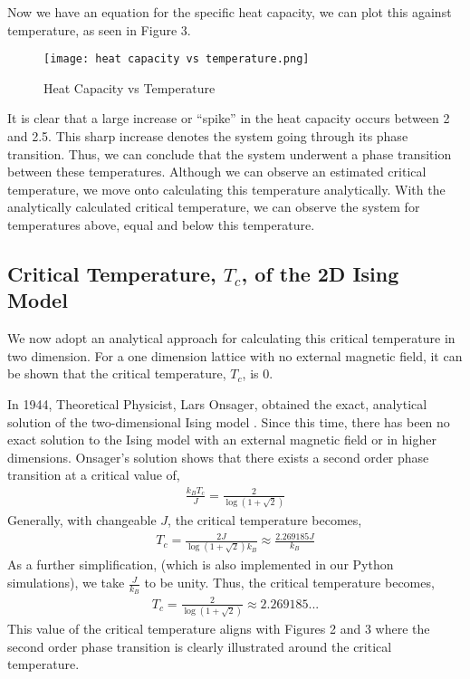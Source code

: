 \documentclass[a4paper]{article}
\begin{document}
Now we have an equation for the specific heat capacity, we can plot this against temperature, as seen in Figure 3. 

\begin{figure}[h!]
  \texttt{[image: heat capacity vs temperature.png]}
  \caption{Heat Capacity vs Temperature}
  \label{fig:estimated_mean}
\end{figure} 

It is clear that a large increase or “spike” in the heat capacity occurs between 2 and 2.5. This sharp increase denotes the system going through its phase transition. Thus, we can conclude that the system underwent a phase transition between these temperatures. Although we can observe an estimated critical temperature, we move onto calculating this temperature analytically. With the analytically calculated critical temperature, we can observe the system for temperatures above, equal and below this temperature.

\subsection{Critical Temperature, $T_{c}$, of the 2D Ising Model}

We now adopt an analytical approach for calculating this critical temperature in two dimension. For a one dimension lattice with no external magnetic field, it can be shown that the critical temperature, $T_{c}$, is 0. 

In 1944, Theoretical Physicist, Lars Onsager, obtained the exact, analytical solution of the two-dimensional Ising model \cite{9}. Since this time, there has been no exact solution to the Ising model with an external magnetic field or in higher dimensions. Onsager's solution shows that there exists a second order phase transition at a critical value of,
\begin{align*}
\frac{k_{B}T_{c}}{J} = \frac{2}{\log(1 + \sqrt{2})}
\end{align*}
\cite{8} Generally, with changeable $J$, the critical temperature becomes, 
\begin{align*}
T_{c} = \frac{2J}{\log(1 + \sqrt{2})k_{B}} \approx \frac{2.269185J}{k_{B}}
\end{align*}
As a further simplification, (which is also implemented in our Python simulations), we take $\frac{J}{k_{ B}}$ to be unity. Thus, the critical temperature becomes, 
\begin{align*}
T_{c} = \frac{2}{\log(1 + \sqrt{2})} \approx 2.269185...
\end{align*}
This value of the critical temperature aligns with Figures 2 and 3 where the second order phase transition is clearly illustrated around the critical temperature.
\end{document}
